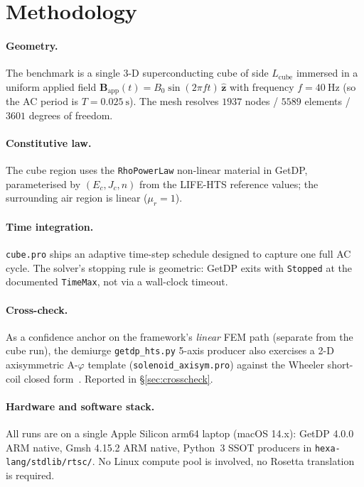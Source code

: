 \documentclass[11pt,a4paper]{article}
\begin{document}
\section{Methodology}
\label{sec:method}

\paragraph{Geometry.} The benchmark is a single 3-D superconducting
cube of side $L_{\mathrm{cube}}$ immersed in a uniform applied field
$\mathbf{B}_{\mathrm{app}}(t) = B_0 \sin(2\pi f t)\,\hat{\mathbf{z}}$
with frequency $f = 40~\mathrm{Hz}$ (so the AC period is
$T = 0.025~\mathrm{s}$). The mesh resolves $1937$ nodes / $5589$
elements / $3601$ degrees of freedom.

\paragraph{Constitutive law.} The cube region uses the
\texttt{RhoPowerLaw} non-linear material in GetDP, parameterised by
$(E_c, J_c, n)$ from the LIFE-HTS reference values; the surrounding
air region is linear ($\mu_r = 1$).

\paragraph{Time integration.} \texttt{cube.pro} ships an adaptive
time-step schedule designed to capture one full AC cycle. The
solver's stopping rule is geometric: GetDP exits with
\texttt{Stopped} at the documented \texttt{TimeMax}, not via a
wall-clock timeout.

\paragraph{Cross-check.} As a confidence anchor on the framework's
\emph{linear} FEM path (separate from the cube run), the demiurge
\texttt{getdp\_hts.py} 5-axis producer also exercises a 2-D
axisymmetric A-$\varphi$ template (\texttt{solenoid\_axisym.pro})
against the Wheeler short-coil closed
form~\cite{wheeler1942}. Reported in \S\ref{sec:crosscheck}.

\paragraph{Hardware and software stack.} All runs are on a single
Apple Silicon arm64 laptop (macOS 14.x): GetDP 4.0.0 ARM native,
Gmsh 4.15.2 ARM native, Python~3 SSOT producers in
\texttt{hexa-lang/stdlib/rtsc/}. No Linux compute pool is involved,
no Rosetta translation is required.
\end{document}
